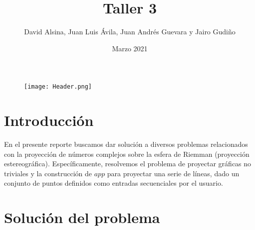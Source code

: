 \documentclass[a4paper,12pt]{article}
\title{{\color{blueMacc}Taller 3}}
\author{David Alsina, Juan Luis Ávila, Juan Andrés Guevara y Jairo Gudiño}
\date{Marzo 2021}
\begin{document}
    \begin{figure}[ht]
        \centering
        \texttt{[image: Header.png]}
        \maketitle
    \end{figure}

    \section{Introducción}
        En el presente reporte buscamos dar solución a diversos problemas relacionados con la proyección de números complejos sobre la esfera de Riemman (proyección estereográfica). Específicamente, resolvemos el problema de proyectar gráficas no triviales y la construcción de $app$ para proyectar una serie de líneas, dado un conjunto de puntos definidos como entradas secuenciales por el usuario. 
    
    \section{Solución del problema}
    
\end{document}
